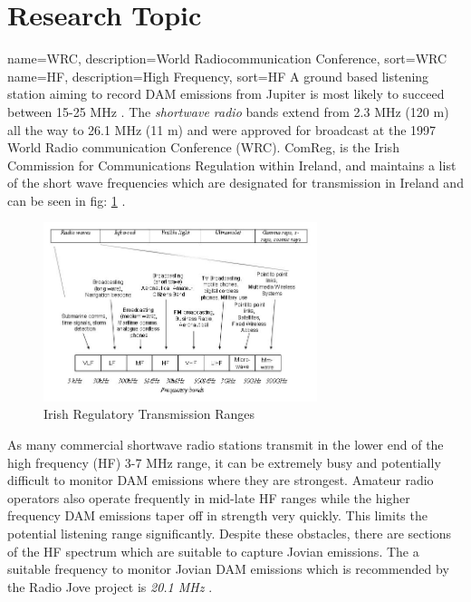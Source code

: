 \documentclass[runningheads,a4paper]{llncs}
\begin{document}
%
%
\newpage
\section*{Research Topic}
%
%
{
  name={WRC},
  description={World Radiocommunication Conference},
  sort=WRC
}
{
  name={HF},
  description={High Frequency},
  sort=HF
}
%
A ground based listening station aiming to record \gls{DAM} emissions from Jupiter is most likely to succeed between 15-25 MHz \citep{wilkinson94}. The \textit{shortwave radio} bands extend from 2.3 MHz (120 m) all the way to 26.1 MHz (11 m) and were approved for broadcast at the 1997 World Radio communication Conference (\gls{WRC}). ComReg, is the Irish Commission for Communications Regulation within Ireland, and maintains a list of the short wave frequencies which are designated for transmission in Ireland and can be seen in fig: \ref{fig:irish_electromagnetic_transmission_ranges} \citep{comreg14}. 

%
\begin{figure}[here]
\centering
\includegraphics[width=8cm]{images/06}
\caption{Irish Regulatory Transmission Ranges \citep{comreg14}}
\label{fig:irish_electromagnetic_transmission_ranges}
\end{figure}
%

As many commercial shortwave radio stations transmit in the lower end of the high frequency (\gls{HF}) 3-7 MHz range, it can be extremely busy and potentially difficult to monitor \gls{DAM} emissions where they are strongest. Amateur radio operators also operate frequently in mid-late \gls{HF} ranges while the higher frequency \gls{DAM} emissions taper off in strength very quickly. This limits the potential listening range significantly. Despite these obstacles, there are sections of the \gls{HF} spectrum which are suitable to capture Jovian emissions. The a suitable frequency to monitor Jovian \gls{DAM} emissions which is recommended by the Radio Jove project is \textit{20.1 MHz} \citep{nasa12}. 
\end{document}
